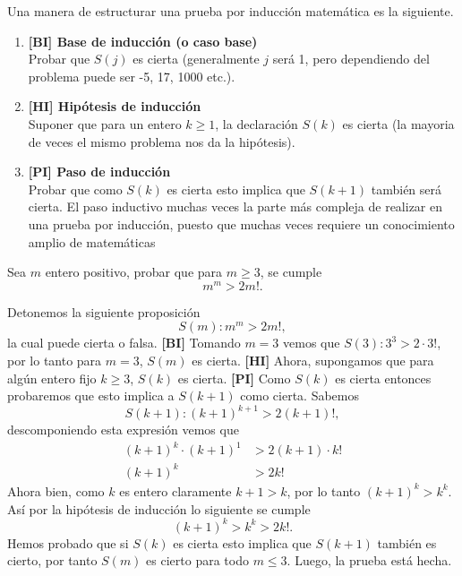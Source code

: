 Una manera de estructurar una prueba por inducción matemática es la siguiente.
\begin{enumerate}
    \item \textbf{[BI] Base de inducción (o caso base)}\\
    Probar que $S(j)$ es cierta (generalmente $j$ será 1, pero dependiendo del problema puede ser -5, 17, 1000 etc.).

    \item \textbf{[HI] Hipótesis de inducción}\\
    Suponer que para un entero $k \geq 1$, la declaración $S(k)$ es cierta (la mayoria de veces el mismo problema nos da la hipótesis).

    \item \textbf{[PI] Paso de inducción}\\
    Probar que como $S(k)$ es cierta esto implica que $S(k + 1)$ también será cierta.
    El paso inductivo muchas veces la parte más compleja de realizar en una prueba por inducción, puesto que muchas veces requiere un conocimiento amplio de matemáticas
\end{enumerate}

\begin{example}
    Sea $m$ entero positivo, probar que para $m \geq 3$, se cumple \[m^m > 2m!.\]
\end{example}

\begin{solution}
    Detonemos la siguiente proposición
    \[
        S(m) : m^m > 2m!,
    \]
    la cual puede cierta o falsa.
    \textbf{[BI]} Tomando $m = 3$ vemos que $S(3) : 3^3 > 2\cdot3!$, por lo tanto para $m = 3$, $S(m)$ es cierta.
    \textbf{[HI]} Ahora, supongamos que para algún entero fijo $k\geq 3$, $S(k)$ es cierta.
    \textbf{[PI]} Como $S(k)$ es cierta entonces probaremos que esto implica a $S(k + 1)$ como cierta.
    Sabemos
    \[
        S(k + 1) : (k + 1)^{k + 1} > 2(k + 1)!,
    \]
    descomponiendo esta expresión vemos que
    \begin{align*}
    (k + 1)
        ^{k}\cdot(k + 1)^1 &> 2(k + 1)\cdot k!\\
        (k + 1)^k &> 2k!
    \end{align*}
    Ahora bien, como $k$ es entero claramente $k + 1 > k$, por lo tanto $(k + 1)^k > k^k$.
    Así por la hipótesis de inducción lo siguiente se cumple
    \[
        (k + 1)^k > k^k > 2k!.
    \]
    Hemos probado que si $S(k)$ es cierta esto implica que $S(k + 1)$ también es cierto, por tanto $S(m)$ es cierto para todo $m \leq 3$.
    Luego, la prueba está hecha.
\end{solution}

